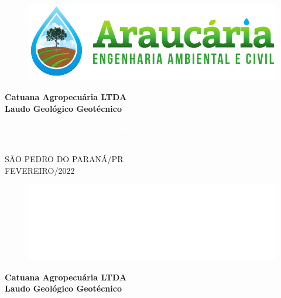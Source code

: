 \thispagestyle{empty}
\chead{}
\begin{figure}[t!]
	\centering
	\includegraphics[width = 7 cm]{./imagens/logo.pdf}
\end{figure}
\mbox{}

\vspace{6.5cm}

\begin{center}
	{\Large \bfseries
		Catuana Agropecuária LTDA\\
		Laudo Geológico Geotécnico
	}
\end{center}
\mbox{}

\vfill

\begin{flushright}
	\begin{minipage}[h]{8cm}
		{\footnotesize \textcolor{white}{Laudo Geológico-Geotécnico elaborado conforme
				diretrizes do Anexo V da Resolução SEDEST 68/2019.}}
	\end{minipage}
\end{flushright}

\vfill

\begin{center}
	{\large
		{SÃO PEDRO DO PARANÁ/PR\\
			FEVEREIRO/2022}
	}
\end{center}
\newpage

\thispagestyle{empty}
\begin{figure}[t!]
	\centering
	\includegraphics[width = 7 cm]{./imagens/logo2.pdf}
\end{figure}
\mbox{}

\vspace{6.5cm}
\begin{center}
	{\Large \bfseries
		Catuana Agropecuária LTDA\\
		Laudo Geológico Geotécnico
	}
\end{center}

